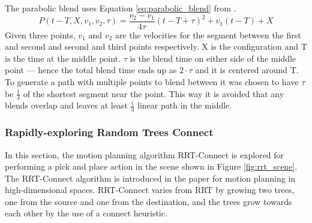 \documentclass[../main.tex]{subfiles}
\begin{document}
The parabolic blend uses Equation \ref{eq:parabolic_blend} from \cite{lec_notes}.
\begin{equation}\label{eq:parabolic_blend}
    P(t-T,X,v_1,v_2,\tau)=\frac{v_2-v_1}{4\tau}(t-T+\tau)^2+v_1(t-T)+X
\end{equation}
Given three points, $v_1$ and $v_2$ are the velocities for the segment between the first and second and second and third points respectively. X is the configuration and T is the time at the middle point. $\tau$ is the blend time on either side of the middle point --- hence the total blend time ends up as $2\cdot\tau$ and it is centered around T. To generate a path with multiple points to blend between it was chosen to have $\tau$ be $\frac{1}{3}$ of the shortest segment near the point. This way it is avoided that any blends overlap and leaves at least $\frac{1}{3}$ linear path in the middle.

\subsubsection{Rapidly-exploring Random Trees Connect} \label{subsec:rrt_connect}
In this section, the motion planning algorithm RRT-Connect is explored for performing a pick and place action in the scene shown in Figure \ref{fig:rrt_scene}. The RRT-Connect algorithm is introduced in the paper \cite{rrt_connect} for motion planning in high-dimensional spaces. RRT-Connect varies from RRT by growing two trees, one from the source and one from the destination, and the trees grow towards each other by the use of a connect heuristic.
\end{document}
